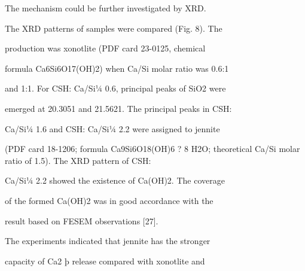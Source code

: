 \documentclass[a4paper,portrait,12pt]{article}
\begin{document}
\begin{flushleft}
The mechanism could be further investigated by XRD.
\end{flushleft}


\begin{flushleft}
The XRD patterns of samples were compared (Fig. 8). The
\end{flushleft}


\begin{flushleft}
production was xonotlite (PDF card 23-0125, chemical
\end{flushleft}


\begin{flushleft}
formula Ca6Si6O17(OH)2) when Ca/Si molar ratio was 0.6:1
\end{flushleft}


\begin{flushleft}
and 1:1. For CSH: Ca/Si¼ 0.6, principal peaks of SiO2 were
\end{flushleft}


\begin{flushleft}
emerged at 20.3051 and 21.5621. The principal peaks in CSH:
\end{flushleft}


\begin{flushleft}
Ca/Si¼ 1.6 and CSH: Ca/Si¼ 2.2 were assigned to jennite
\end{flushleft}


\begin{flushleft}
(PDF card 18-1206; formula Ca9Si6O18(OH)6 ? 8 H2O; theoretical Ca/Si molar ratio of 1.5). The XRD pattern of CSH:
\end{flushleft}


\begin{flushleft}
Ca/Si¼ 2.2 showed the existence of Ca(OH)2. The coverage
\end{flushleft}


\begin{flushleft}
of the formed Ca(OH)2 was in good accordance with the
\end{flushleft}


\begin{flushleft}
result based on FESEM observations [27].
\end{flushleft}


\begin{flushleft}
The experiments indicated that jennite has the stronger
\end{flushleft}


\begin{flushleft}
capacity of Ca2 þ release compared with xonotlite and
\end{flushleft}
\end{document}
